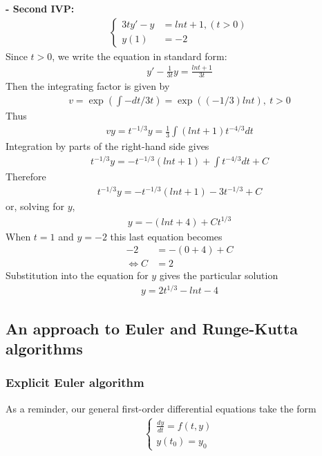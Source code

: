 \documentclass[a4paper]{article}
\numberwithin{equation}{section}
\begin{document}
\textbf{- Second IVP:}
\begin{align*}
  \begin{cases}
    3ty' - y & = lnt + 1, (t > 0) \\
    y(1)     & = -2
  \end{cases}
\end{align*}
Since \(t > 0\), we write the equation in standard form:
\begin{align*}
  y' - \frac{1}{3t}y = \frac{lnt + 1}{3t}
\end{align*}
Then the integrating factor is given by
\begin{align*}
  v = \exp \left(\int -dt/3t\right) = \exp((-1/3)lnt),\ t > 0
\end{align*}
Thus
\begin{align*}
  vy = t^{-1/3} y = \frac{1}{3} \int(lnt + 1) t^{-4/3} dt
\end{align*}
Integration by parts of the right-hand side gives
\begin{align*}
  t^{-1/3}y = -t^{-1/3}(lnt+1) + \int t^{-4/3}dt + C
\end{align*}
Therefore
\begin{align*}
  t^{-1/3}y = -t^{-1/3}(lnt+1) - 3t^{-1/3} + C
\end{align*}
or, solving for \(y\),
\begin{align*}
  y = -(lnt + 4) + Ct^{1/3}
\end{align*}
When \(t = 1\) and \(y = -2\) this last equation becomes
\begin{align*}
  -2                & = -(0+4) + C \\
  \Leftrightarrow C & = 2
\end{align*}
Substitution into the equation for \(y\) gives the particular solution
\begin{align*}
  y = 2t^{1/3} - lnt - 4
\end{align*}

\subsection{An approach to Euler and Runge-Kutta algorithms}
\subsubsection{Explicit Euler algorithm}\label{sssec:explicit_euler}
As a reminder, our general first-order differential equations take the form
\begin{align*}
  \begin{cases}
    \frac{dy}{dt} = f(t,y) \\
    y(t_0) = y_0
  \end{cases}
\end{align*}
\end{document}
